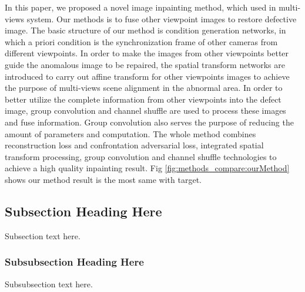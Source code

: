 \documentclass{IEEE_lsens}
\begin{document}
In this paper, we proposed a novel image inpainting method, which used in multi-views system. Our methods is to fuse other viewpoint images to restore defective image. The basic structure of our method is condition generation networks, in which a priori condition is the synchronization frame of other cameras from different viewpoints. In order to make the images from other viewpoints better guide the anomalous image to be repaired, the spatial transform networks are introduced to carry out affine transform for other viewpoints images to achieve the purpose of multi-views scene alignment in the abnormal area. In order to better utilize the complete information from other viewpoints into the defect image, group convolution and channel shuffle are used to process these images and fuse information. Group convolution also serves the purpose of reducing the amount of parameters and computation. The whole method combines reconstruction loss and confrontation adversarial loss, integrated spatial transform processing, group convolution and channel shuffle technologies to achieve a high quality inpainting result. Fig \ref{fig:methods_compare:ourMethod} shows our method result is the most same with target.

\subsection{Subsection Heading Here}
Subsection text here.


\subsubsection{Subsubsection Heading Here}
Subsubsection text here.
\end{document}
